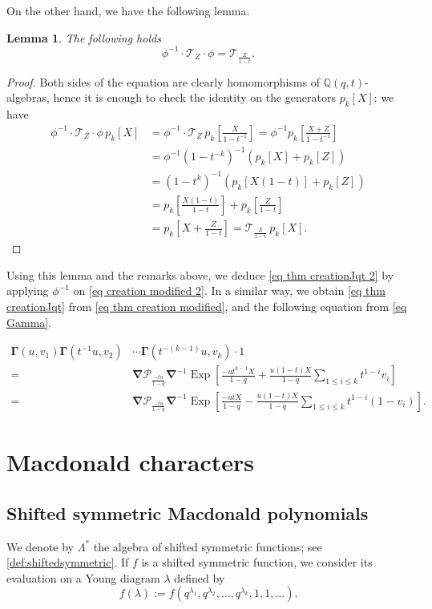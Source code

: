 \documentclass[12pt]{amsart}
\newtheorem{lem}[thm]{Lemma}
\theoremstyle{remark}
\newcommand{\nablaJ}{\boldsymbol{\nabla}}
\newcommand{\GammaJ}{\boldsymbol{\Gamma}}
\newcommand{\Pop}{\mathcal{P}}
\newcommand{\Top}{\mathcal{T}}
\DeclareMathOperator{\Exp}{Exp}
\begin{document}
On the other hand, we have the following lemma.
\begin{lem}
The following holds
    \[\phi^{-1}\cdot \Top_{Z}\cdot\phi=\Top_{\frac{Z}{1-t}}.\]
\end{lem}
\begin{proof}
Both sides of the equation are clearly homomorphisms of $\mathbb{Q}(q,t)$-algebras, hence it is enough to check the identity on the generators $p_k[X]$: we have
\begin{align*}
	\phi^{-1}\cdot \Top_{Z}\cdot\phi\, p_k[X] & = \phi^{-1}\cdot \Top_{Z}\, p_k\left[\frac{X}{1-t^{-1}}\right]= \phi^{-1} p_k\left[\frac{X+Z}{1-t^{-1}}\right] \\ & = \phi^{-1} (1-t^{-k})^{-1}(p_k[X] + p_k[Z]) \\ & = (1-t^{k})^{-1}(p_k[X(1-t)] + p_k[Z])\\
	&  = p_k\left[\frac{X(1-t)}{1-t}\right] +p_k\left[\frac{Z}{1-t}\right]\\
	& =p_k\left[X+\frac{Z}{1-t}\right] = \Top_{\frac{Z}{1-t}}\,  p_k[X].
\end{align*}
\end{proof}

Using this lemma and the remarks above, we deduce \cref{eq thm creationJqt 2} by applying $\phi^{-1}$ on \cref{eq creation modified 2}. In a similar way, we obtain \cref{eq thm creationJqt} from \cref{eq thm creation modified}, and the following equation from \cref{eq Gamma}. 

\begin{align}\label{eq GammaJ operator}
\GammaJ(u,v_1)\GammaJ(t^{-1}u,v_2)&\cdots \GammaJ(t^{-(k-1)} u,v_k)  \cdot 1\\
=&\nablaJ \Pop_{\frac{-tu}{1-q}}\nablaJ^{-1}\Exp\left[\frac{-ut^{k-1}X}{1-q}+\frac{u(1-t)X}{1-q}\sum_{1\leq i\leq k}t^{1-i}v_i\right]\nonumber\\
=&\nablaJ \Pop_{\frac{-tu}{1-q}}\nablaJ^{-1}\Exp\left[\frac{-utX}{1-q}-\frac{u(1-t)X}{1-q}\sum_{1\leq i\leq k}t^{1-i}(1-v_i)\right].\nonumber
\end{align}

\section{Macdonald characters}\label{sec characters}

\subsection{Shifted symmetric Macdonald polynomials}
We denote by $\Lambda^*$ the algebra of shifted symmetric functions; see \cref{def:shiftedsymmetric}.  If $f$ is a shifted symmetric function, we consider its evaluation on a Young diagram $\lambda$ defined by
$$f(\lambda):=f(q^{\lambda_1},q^{\lambda_2},\dots ,q^{\lambda_k},1,1,\dots ).$$
\end{document}
